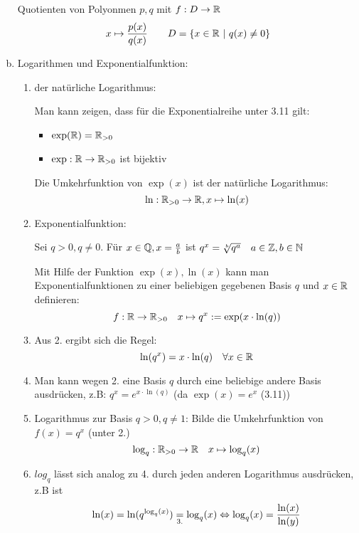\documentclass[10pt, a4paper, fleqn]{article}
\begin{document}
\begin{enumerate}[a), start = 6]
        Quotienten von Polyonmen $p,q$ mit $f: D \to \mathbb{R}$
        \[
            x \mapsto \frac{p(x)}{q(x)} \qquad D=\{x \in \mathbb{R} \ | \ q(x) \neq 0\}
        \]

        \item Logarithmen und Exponentialfunktion:

        \begin{enumerate}[1.]
            \item der natürliche Logarithmus:

            Man kann zeigen, dass für die Exponentialreihe unter 3.11 gilt:
            \begin{itemize}
                \item $\exp(\mathbb{R}) = \mathbb{R}_{> 0}$
                \item $\exp: \mathbb{R} \to \mathbb{R}_{> 0}$ ist bijektiv
            \end{itemize}
            Die Umkehrfunktion von $\exp(x)$ ist der natürliche Logarithmus:
            \[
                \ln: \mathbb{R}_{> 0} \to \mathbb{R}, x \mapsto \ln(x)
            \]

            \item Exponentialfunktion:

            Sei $q > 0, q \neq 0$. Für $x \in \mathbb{Q}, x = \frac{a}{b}$ ist
            $q^x = \sqrt[b]{q^a} \quad a \in \mathbb{Z}, b \in \mathbb{N}$

            Mit Hilfe der Funktion $\exp(x), \ln(x)$ kann man Exponentialfunktionen
            zu einer beliebigen gegebenen Basis $q$ und $x \in \mathbb{R}$ definieren:
            \[
                f: \mathbb{R} \to \mathbb{R}_{> 0} \quad x \mapsto q^x := \exp(x \cdot \ln(q))     
            \]

            \item Aus 2. ergibt sich die Regel:
            \[
                \ln(q^x) = x \cdot \ln(q) \quad \forall x \in \mathbb{R}
            \]

            \item Man kann wegen 2. eine Basis $q$ durch eine beliebige andere Basis ausdrücken,
            z.B: $q^x = e^{x \cdot \ln(q)}$ (da $\exp(x) = e^x$ (3.11))

            \item Logarithmus zur Basis $q > 0, q \neq 1$: Bilde die Umkehrfunktion
            von $f(x) = q^x$ (unter 2.)
            \[
                \log_q: \mathbb{R}_{>0} \to \mathbb{R} \quad x \mapsto \log_q(x)    
            \]

            \item $log_q$ lässt sich analog zu 4. durch jeden anderen Logarithmus ausdrücken,
            z.B ist 
            \[
                \ln(x) = \ln(q^{\log_q(x)}) \underset{3.}{=} \log_q(x)
                \Leftrightarrow \log_q(x) = \frac{\ln(x)}{\ln(y)}
            \]


\end{enumerate}
\end{enumerate}
\end{document}
